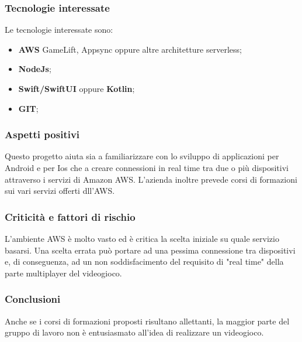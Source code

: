 \subsubsection{Tecnologie interessate}
Le tecnologie interessate sono:
\begin{itemize}
	\item \textbf{AWS} GameLift, Appsync oppure altre architetture serverless;
	\item \textbf{NodeJs};
	\item \textbf{Swift/SwiftUI} oppure \textbf{Kotlin};
	\item \textbf{GIT};
\end{itemize}
\subsubsection{Aspetti positivi}
Questo progetto aiuta sia a familiarizzare con lo sviluppo di applicazioni per Android e per Ios che a creare connessioni in real time tra due o più dispositivi attraverso i servizi di Amazon AWS. L'azienda inoltre prevede corsi di formazioni sui vari servizi offerti dll'AWS.
\subsubsection{Criticità e fattori di rischio}
L'ambiente AWS è molto vasto ed è critica la scelta iniziale su quale servizio basarsi. Una scelta errata può portare ad una pessima connessione tra dispositivi e, di conseguenza, ad un non soddisfacimento del requisito di "real time" della parte multiplayer del videogioco.
\subsubsection{Conclusioni}
Anche se i corsi di formazioni proposti risultano allettanti, la maggior parte del gruppo di lavoro non è entusiasmato all'idea di realizzare un videogioco.